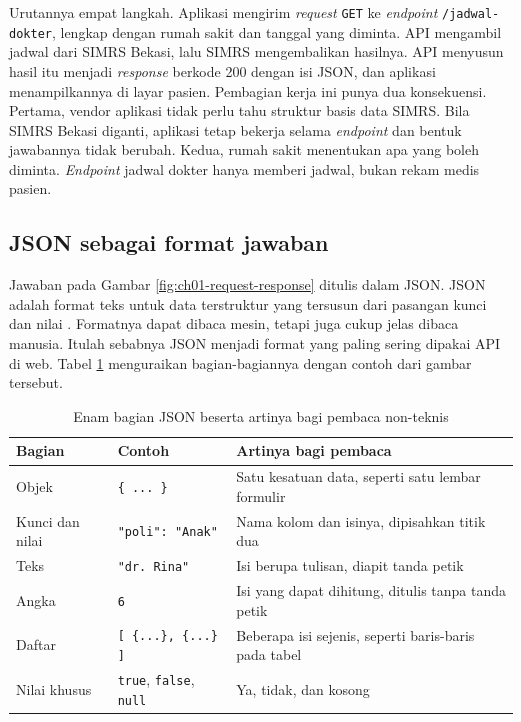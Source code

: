 Urutannya empat langkah. Aplikasi mengirim \textit{request} \texttt{GET} ke
\textit{endpoint} \texttt{/jadwal-dokter}, lengkap dengan rumah sakit dan tanggal
yang diminta. API mengambil jadwal dari SIMRS Bekasi, lalu SIMRS mengembalikan
hasilnya. API menyusun hasil itu menjadi \textit{response} berkode 200 dengan isi
JSON, dan aplikasi menampilkannya di layar pasien. Pembagian kerja ini punya dua
konsekuensi. Pertama, vendor aplikasi tidak perlu tahu struktur basis data SIMRS.
Bila SIMRS Bekasi diganti, aplikasi tetap bekerja selama \textit{endpoint} dan
bentuk jawabannya tidak berubah. Kedua, rumah sakit menentukan apa yang boleh
diminta. \textit{Endpoint} jadwal dokter hanya memberi jadwal, bukan rekam medis
pasien.

\subsection*{JSON sebagai format jawaban}

Jawaban pada Gambar \ref{fig:ch01-request-response} ditulis dalam JSON. JSON
adalah format teks untuk data terstruktur yang tersusun dari pasangan kunci dan
nilai \cite{c01-rfc8259}. Formatnya dapat dibaca mesin, tetapi juga cukup jelas
dibaca manusia. Itulah sebabnya JSON menjadi format yang paling sering dipakai
API di web. Tabel \ref{tab:ch01-json} menguraikan bagian-bagiannya dengan contoh
dari gambar tersebut.

\begin{table}[!htb]
  \centering
  \caption{Enam bagian JSON beserta artinya bagi pembaca non-teknis}
  \label{tab:ch01-json}
  \begin{tabularx}{\textwidth}{>{\raggedright\arraybackslash}p{2.2cm}
                               >{\raggedright\arraybackslash}p{4.0cm}
                               >{\raggedright\arraybackslash}X}
    \hline
    \textbf{Bagian} & \textbf{Contoh} & \textbf{Artinya bagi pembaca} \\
    \hline
    Objek & \texttt{\{ ... \}} & Satu kesatuan data, seperti satu lembar formulir \\
    \hline
    Kunci dan nilai & \texttt{"poli": "Anak"} & Nama kolom dan isinya, dipisahkan titik dua \\
    \hline
    Teks & \texttt{"dr. Rina"} & Isi berupa tulisan, diapit tanda petik \\
    \hline
    Angka & \texttt{6} & Isi yang dapat dihitung, ditulis tanpa tanda petik \\
    \hline
    Daftar & \texttt{[ \{...\}, \{...\} ]} & Beberapa isi sejenis, seperti baris-baris pada tabel \\
    \hline
    Nilai khusus & \texttt{true}, \texttt{false}, \texttt{null} & Ya, tidak, dan kosong \\
    \hline
  \end{tabularx}
\end{table}

